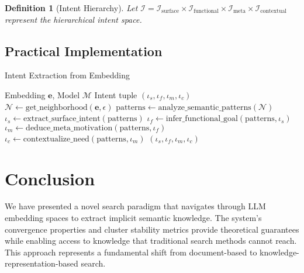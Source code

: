 \documentclass{article}
\newtheorem{definition}{Definition}
\begin{document}
\begin{definition}[Intent Hierarchy]
Let $\mathcal{I} = \mathcal{I}_{\text{surface}} \times \mathcal{I}_{\text{functional}} \times \mathcal{I}_{\text{meta}} \times \mathcal{I}_{\text{contextual}}$ represent the hierarchical intent space.
\end{definition}

\subsection{Practical Implementation}

\begin{algorithm}
\caption{Intent Extraction from Embedding}
\begin{algorithmic}[1]
\REQUIRE Embedding $\mathbf{e}$, Model $\mathcal{M}$
\ENSURE Intent tuple $(\iota_s, \iota_f, \iota_m, \iota_c)$
\STATE $\mathcal{N} \leftarrow \text{get\_neighborhood}(\mathbf{e}, \epsilon)$
\STATE $\text{patterns} \leftarrow \text{analyze\_semantic\_patterns}(\mathcal{N})$
\STATE $\iota_s \leftarrow \text{extract\_surface\_intent}(\text{patterns})$
\STATE $\iota_f \leftarrow \text{infer\_functional\_goal}(\text{patterns}, \iota_s)$
\STATE $\iota_m \leftarrow \text{deduce\_meta\_motivation}(\text{patterns}, \iota_f)$
\STATE $\iota_c \leftarrow \text{contextualize\_need}(\text{patterns}, \iota_m)$
\RETURN $(\iota_s, \iota_f, \iota_m, \iota_c)$
\end{algorithmic}
\end{algorithm}


\section{Conclusion}

We have presented a novel search paradigm that navigates through LLM embedding spaces to extract implicit semantic knowledge. The system's convergence properties and cluster stability metrics provide theoretical guarantees while enabling access to knowledge that traditional search methods cannot reach. This approach represents a fundamental shift from document-based to knowledge-representation-based search.



\end{document}
